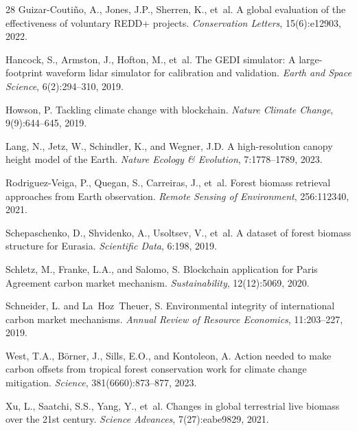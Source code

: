 \begin{thebibliography}{28}
Guizar-Couti{\~n}o, A., Jones, J.P., Sherren, K., et~al.
\newblock A global evaluation of the effectiveness of voluntary REDD+ projects.
\newblock \emph{Conservation Letters}, 15(6):e12903, 2022.

Hancock, S., Armston, J., Hofton, M., et~al.
\newblock The GEDI simulator: A large-footprint waveform lidar simulator for
  calibration and validation.
\newblock \emph{Earth and Space Science}, 6(2):294--310, 2019.

Howson, P.
\newblock Tackling climate change with blockchain.
\newblock \emph{Nature Climate Change}, 9(9):644--645, 2019.

Lang, N., Jetz, W., Schindler, K., and Wegner, J.D.
\newblock A high-resolution canopy height model of the Earth.
\newblock \emph{Nature Ecology \& Evolution}, 7:1778--1789, 2023.

Rodriguez-Veiga, P., Quegan, S., Carreiras, J., et~al.
\newblock Forest biomass retrieval approaches from Earth observation.
\newblock \emph{Remote Sensing of Environment}, 256:112340, 2021.

Schepaschenko, D., Shvidenko, A., Usoltsev, V., et~al.
\newblock A dataset of forest biomass structure for Eurasia.
\newblock \emph{Scientific Data}, 6:198, 2019.

Schletz, M., Franke, L.A., and Salomo, S.
\newblock Blockchain application for Paris Agreement carbon market mechanism.
\newblock \emph{Sustainability}, 12(12):5069, 2020.

Schneider, L. and La~Hoz~Theuer, S.
\newblock Environmental integrity of international carbon market mechanisms.
\newblock \emph{Annual Review of Resource Economics}, 11:203--227, 2019.

West, T.A., B{\"o}rner, J., Sills, E.O., and Kontoleon, A.
\newblock Action needed to make carbon offsets from tropical forest
  conservation work for climate change mitigation.
\newblock \emph{Science}, 381(6660):873--877, 2023.

Xu, L., Saatchi, S.S., Yang, Y., et~al.
\newblock Changes in global terrestrial live biomass over the 21st century.
\newblock \emph{Science Advances}, 7(27):eabe9829, 2021.


\end{thebibliography}
